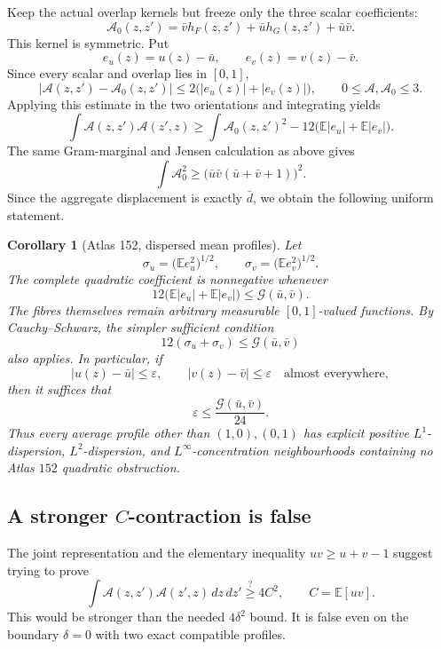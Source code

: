\documentclass[11pt]{article}
\newtheorem{corollary}[theorem]{Corollary}
\begin{document}
Keep the actual overlap kernels but freeze only the three scalar
coefficients:
\[
 \mathcal A_0(z,z')
 =\bar v h_F(z,z')+\bar u h_G(z,z')+\bar u\bar v.
\]
This kernel is symmetric.  Put
\[
 e_u(z)=u(z)-\bar u,
 \qquad
 e_v(z)=v(z)-\bar v.
\]
Since every scalar and overlap lies in $[0,1]$,
\[
 |\mathcal A(z,z')-\mathcal A_0(z,z')|
 \leq2\bigl(|e_u(z)|+|e_v(z)|\bigr),
 \qquad 0\leq\mathcal A,\mathcal A_0\leq3.
\]
Applying this estimate in the two orientations and integrating yields
\begin{equation}
 \int\mathcal A(z,z')\mathcal A(z',z)
 \geq\int\mathcal A_0(z,z')^2
 -12\bigl(\mathbb E|e_u|+\mathbb E|e_v|\bigr).
 \label{eq:atlas152-dispersion-error}
\end{equation}
The same Gram-marginal and Jensen calculation as above gives
\[
 \int\mathcal A_0^2
 \geq\bigl(\bar u\bar v(\bar u+\bar v+1)\bigr)^2.
\]
Since the aggregate displacement is exactly $\bar d$, we obtain the
following uniform statement.

\begin{corollary}[Atlas 152, dispersed mean profiles]
\label{cor:atlas152-profile-concentration}
Let
\[
 \sigma_u=\bigl(\mathbb E e_u^2\bigr)^{1/2},
 \qquad
 \sigma_v=\bigl(\mathbb E e_v^2\bigr)^{1/2}.
\]
The complete quadratic coefficient is nonnegative whenever
\[
 12\bigl(\mathbb E|e_u|+\mathbb E|e_v|\bigr)
 \leq\mathcal G(\bar u,\bar v).
\]
The fibres themselves remain arbitrary measurable $[0,1]$-valued functions.
By Cauchy--Schwarz, the simpler sufficient condition
\[
 12(\sigma_u+\sigma_v)\leq\mathcal G(\bar u,\bar v)
\]
also applies.  In particular, if
\begin{equation}
 |u(z)-\bar u|\leq\varepsilon,
 \qquad
 |v(z)-\bar v|\leq\varepsilon
 \quad\text{almost everywhere},
 \label{eq:atlas152-profile-concentration}
\end{equation}
then it suffices that
\[
 \varepsilon\leq\frac{\mathcal G(\bar u,\bar v)}{24}.
\]
Thus every average profile other than $(1,0),(0,1)$ has explicit positive
$L^1$-dispersion, $L^2$-dispersion, and $L^\infty$-concentration
neighbourhoods containing no Atlas $152$ quadratic obstruction.
\end{corollary}

\subsection{A stronger $C$-contraction is false}

The joint representation and the elementary inequality
$uv\geq u+v-1$ suggest trying to prove
\[
 \int\mathcal A(z,z')\mathcal A(z',z)\,dz\,dz'
 \stackrel{?}{\geq}4C^2,
 \qquad C=\mathbb E[uv].
\]
This would be stronger than the needed $4\delta^2$ bound.  It is false even
on the boundary $\delta=0$ with two exact compatible profiles.
\end{document}
